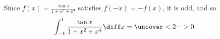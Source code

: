 \begin{frame}
\begin{example} %
Since $f(x) = \frac{\tan x}{1 + x^2 + x^4} $ satisfies $f(-x) = -f(x)$, it is odd, and so
\abovedisplayskip=0pt
\belowdisplayskip=0pt
\begin{align*}
\int_{-1}^1 \frac{\tan x}{1+x^2+x^4} \diff x%
& = %
\uncover<2->{%
0.%
}%
\end{align*}
\end{example}
\end{frame}
